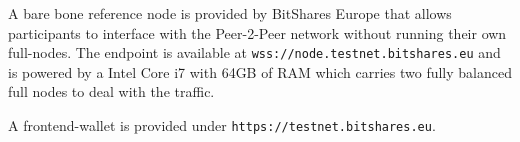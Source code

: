A bare bone reference node is provided by BitShares Europe that allows
participants to interface with the Peer-2-Peer network without running their
own full-nodes. The endpoint is available at
\texttt{wss://node.testnet.bitshares.eu} and is powered by a Intel Core i7 with
64GB of RAM which carries two fully balanced full nodes to deal with the
traffic.

A frontend-wallet is provided under \texttt{https://testnet.bitshares.eu}.
